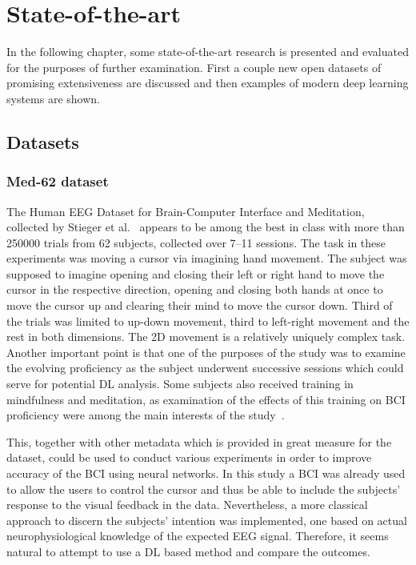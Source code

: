\documentclass[english,BP]{thesiskiv}
\begin{document}

\chapter{State-of-the-art}

	In the following chapter, some state-of-the-art research is presented and evaluated for the purposes of further examination. First a couple new open datasets of promising extensiveness are discussed and then examples of modern deep learning systems are shown.
 
	\section{Datasets}

	\subsection{Med-62 dataset}

	The Human EEG Dataset for Brain-Computer Interface and Meditation, collected by Stieger et al.~\cite{stieger:data:21} appears to be among the best in class with more than 250000 trials from 62 subjects, collected over 7--11 sessions.
	The task in these experiments was moving a cursor via imagining hand movement. The subject was supposed to imagine opening and closing their left or right hand to move the cursor in the respective direction, opening and closing both hands at once to move the cursor up and clearing their mind to move the cursor down. Third of the trials was limited to up-down movement, third to left-right movement and the rest in both dimensions.
	The 2D movement is a relatively uniquely complex task.
	Another important point is that one of the purposes of the study was to examine the evolving proficiency as the subject underwent successive sessions which could serve for potential DL analysis.
	Some subjects also received training in mindfulness and meditation, as examination of the effects of this training on BCI proficiency were among the main interests of the study~\cite{stieger:mindfulness:20}.

	This, together with other metadata which is provided in great measure for the dataset, could be used to conduct various experiments in order to improve accuracy of the BCI using neural networks.
	In this study a BCI was already used to allow the users to control the cursor and thus be able to include the subjects' response to the visual feedback in the data. Nevertheless, a more classical approach to discern the subjects' intention was implemented, one based on actual neurophysiological knowledge of the expected EEG signal. Therefore, it seems natural to attempt to use a DL based method and compare the outcomes.
\end{document}
